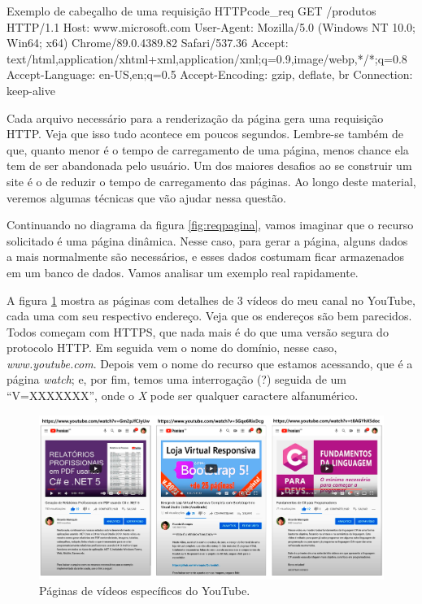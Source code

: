 \begin{htmlcode}{Exemplo de cabeçalho de uma requisição HTTP}{code_req}
GET /produtos HTTP/1.1
Host: www.microsoft.com
User-Agent: Mozilla/5.0 (Windows NT 10.0; Win64; x64) Chrome/89.0.4389.82 Safari/537.36
Accept: text/html,application/xhtml+xml,application/xml;q=0.9,image/webp,*/*;q=0.8
Accept-Language: en-US,en;q=0.5
Accept-Encoding: gzip, deflate, br
Connection: keep-alive
\end{htmlcode}


Cada arquivo necessário para a renderização da página gera uma requisição HTTP. Veja que isso tudo acontece em poucos segundos. Lembre-se também de que, quanto menor é o tempo de carregamento de uma página, menos chance ela tem de ser abandonada pelo usuário. Um dos maiores desafios ao se construir um site é o de reduzir o tempo de carregamento das páginas. Ao longo deste material, veremos algumas técnicas que vão ajudar nessa questão.

Continuando no diagrama da figura \ref{fig:reqpagina}, vamos imaginar que o recurso solicitado é uma página dinâmica. Nesse caso, para gerar a página, alguns dados a mais normalmente são necessários, e esses dados costumam ficar armazenados em um banco de dados. Vamos analisar um exemplo real rapidamente. 

A figura \ref{fig:pagsyout} mostra as páginas com detalhes de 3 vídeos do meu canal no YouTube, cada uma com seu respectivo endereço. Veja que os endereços são bem parecidos. Todos começam com HTTPS, que nada mais é do que uma versão segura do protocolo HTTP. Em seguida vem o nome do domínio, nesse caso, \textit{www.youtube.com}. Depois vem o nome do recurso que estamos acessando, que é a página \textit{watch}; e, por fim, temos uma interrogação (?) seguida de um ``V=XXXXXXX'', onde o \textit{X} pode ser qualquer caractere alfanumérico. 

\begin{figure}[htbp!]
    \centering
    \includegraphics[width=1\textwidth]{Images/chapter01/pags_youtube1.png}
    \caption{Páginas de vídeos específicos do YouTube.}
    \label{fig:pagsyout}
\end{figure}

